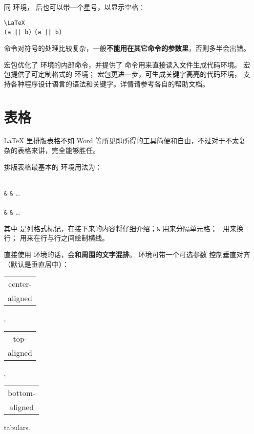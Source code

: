 同  环境， 后也可以带一个星号，以显示空格：
\begin{example}
\verb|\LaTeX| \\
\verb+(a || b)+ \verb*+(a || b)+
\end{example}

 命令对符号的处理比较复杂，一般\textbf{不能用在其它命令的参数里}，否则多半会出错。

 宏包优化了  环境的内部命令，并提供了  命令用来直接读入文件生成代码环境。
 宏包提供了可定制格式的  环境； 宏包更进一步，可生成关键字高亮的代码环境，
支持各种程序设计语言的语法和关键字。详情请参考各自的帮助文档。

\section{表格}\label{sec:tabular}

\LaTeX{} 里排版表格不如 Word 等所见即所得的工具简便和自由，不过对于不太复杂的表格来讲，完全能够胜任。

排版表格最基本的  环境用法为：
\begin{command}
\\
  \texttt\&  \texttt\& \ldots\ \crcmd \\
  \\
  \texttt\&  \texttt\& \ldots\ \crcmd \\
\end{command}
其中  是列格式标记，在接下来的内容将仔细介绍；\texttt\& 用来分隔单元格；
\crcmd\ 用来换行； 用来在行与行之间绘制横线。

直接使用  环境的话，会\textbf{和周围的文字混排}。 环境可带一个可选参数  控制垂直对齐（默认是垂直居中）：
\begin{example}
\begin{tabular}{|c|}
  center-\\ aligned \\
\end{tabular},
\begin{tabular}[t]{|c|}
  top-\\ aligned \\
\end{tabular},
\begin{tabular}[b]{|c|}
  bottom-\\ aligned\\
\end{tabular} tabulars.
\end{example}

